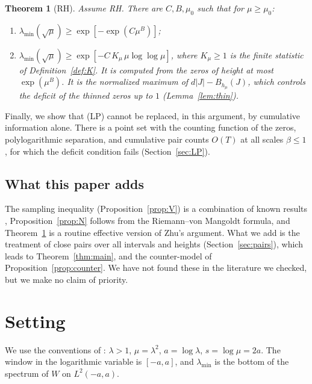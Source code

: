 \documentclass[11pt]{amsart}
\newtheorem{theorem}{Theorem}
\theoremstyle{definition}
\theoremstyle{remark}
\numberwithin{equation}{section}
\begin{document}
\begin{theorem}[RH]\label{thm:RH}
Assume RH. There are $C,B,\mu_0$ such that for $\mu\ge\mu_0$:
\begin{enumerate}
\item[(a)] $\lambda_{\min}(\sqrt\mu)\ge\exp[-\exp(C\mu^B)]$;
\item[(b)] $\lambda_{\min}(\sqrt\mu)\ge\exp[-C\,K_\mu\,\mu\log\log\mu]$, where $K_\mu\ge1$ is the finite statistic of Definition~\ref{def:K}. It is computed from the zeros of height at most $\exp(\mu^B)$. It is the normalized maximum of $d|J|-B_{h_\mu}(J)$, which controls the deficit of the thinned zeros up to $1$ (Lemma~\ref{lem:thin}).
\end{enumerate}
\end{theorem}

Finally, we show that (LP) cannot be replaced, in this argument, by cumulative information alone. There is a point set with the counting function of the zeros, polylogarithmic separation, and cumulative pair counts $O(T)$ at all scales $\beta\le1$, for which the deficit condition fails (Section~\ref{sec:LP}).

\subsection{What this paper adds}
The sampling inequality (Proposition~\ref{prop:V}) is a combination of known results \cite{Voss99,Lindner99,KS21}, Proposition~\ref{prop:N} follows from the Riemann--von Mangoldt formula, and Theorem~\ref{thm:RH} is a routine effective version of Zhu's argument. What we add is the treatment of close pairs over all intervals and heights (Section~\ref{sec:pairs}), which leads to Theorem~\ref{thm:main}, and the counter-model of Proposition~\ref{prop:counter}. We have not found these in the literature we checked, but we make no claim of priority.

\section{Setting}\label{sec:setting}

We use the conventions of \cite{MoriWeilII,MoriWeilIII}: $\lambda>1$, $\mu=\lambda^2$, $a=\log\lambda$, $s=\log\mu=2a$. The window in the logarithmic variable is $[-a,a]$, and $\lambda_{\min}$ is the bottom of the spectrum of $W$ on $L^2(-a,a)$.
\end{document}
